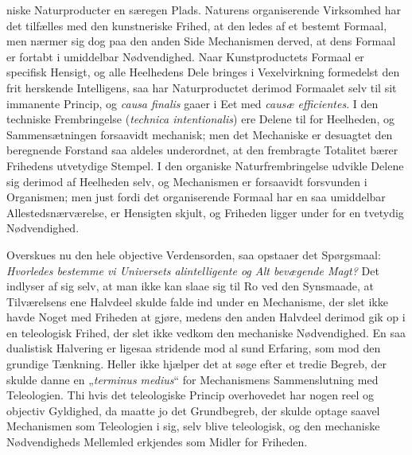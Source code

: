 \documentclass[12pt]{book}
\newcommand{\opage}[1]{\marginnote{\footnotesize\textit{[#1]}}}
\begin{document}
\opage{228} niske Naturproducter en særegen Plads. Naturens organiserende Virksomhed har det tilfælles
med den kunstneriske Frihed, at den ledes af et bestemt Formaal, men nærmer sig dog paa den
anden Side Mechanismen derved, at dens Formaal er fortabt i umiddelbar Nødvendighed. Naar
Kunstproductets Formaal er specifisk Hensigt, og alle Heelhedens Dele bringes i
Vexelvirkning formedelst den frit herskende Intelligens, saa har Naturproductet derimod
Formaalet selv til sit immanente Princip, og \textit{causa finalis} gaaer i Eet med
\textit{causæ efficientes}. I den techniske Frembringelse (\textit{technica intentionalis})
ere Delene til for Heelheden, og Sammensætningen forsaavidt mechanisk; men det Mechaniske er
desuagtet den beregnende Forstand saa aldeles underordnet, at den frembragte Totalitet bærer
Frihedens utvetydige Stempel. I den organiske Naturfrembringelse udvikle Delene sig derimod
af Heelheden selv, og Mechanismen er forsaavidt forsvunden i Organismen; men just fordi det
organiserende Formaal har en saa umiddelbar Allestedsnærværelse, er Hensigten skjult, og
Friheden ligger under for en tvetydig Nødvendighed.

Overskues nu den hele objective Verdensorden, saa opstaaer det Spørgsmaal: \emph{Hvorledes
bestemme vi Universets alintelligente og Alt bevægende Magt?} Det indlyser af sig selv, at
man ikke kan slaae sig til Ro ved den Synsmaade, at Tilværelsens ene Halvdeel skulde falde
ind under en Mechanisme, der slet ikke havde Noget med Friheden at gjøre, medens den anden
Halvdeel derimod gik op i en teleologisk Frihed, der slet ikke vedkom den mechaniske
Nødvendighed. En saa dualistisk Halvering er ligesaa stridende mod al sund Erfaring, som mod
den grundige Tænkning. Heller ikke hjælper det at søge efter et tredie Begreb, der skulde
danne en „\textit{terminus medius}“ for Mechanismens
\opage{229} Sammenslutning med Teleologien. Thi hvis det teleologiske Princip
overhovedet har nogen reel og objectiv Gyldighed, da maatte jo det
Grundbegreb, der skulde optage saavel Mechanismen som Teleologien
i sig, selv blive teleologisk, og den mechaniske Nødvendigheds
Mellemled erkjendes som Midler for Friheden.
\end{document}
